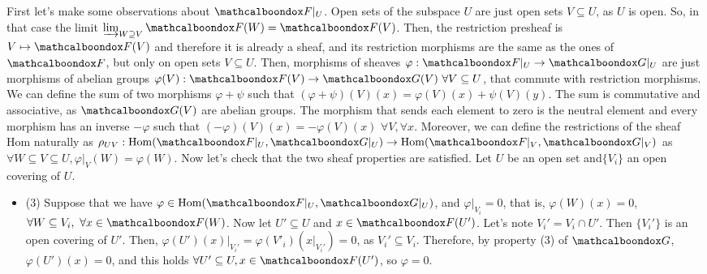 \begin{sol}
	First let's make some observations about $\sF|_U$. Open sets of the subspace $U$ are just open sets $V \subseteq U$, as $U$ is open. So, in that case the limit $\varinjlim_{W \supseteq V} \sF(W) = \sF(V)$. Then, the restriction presheaf is $V \mapsto \sF(V)$ and therefore it is already a sheaf, and its restriction morphisms are the same as the ones of $\sF$, but only on open sets $V \subseteq U$. Then, morphisms of sheaves $\varphi: \sF|_U \to \sG|_U$ are just morphisms of abelian groups $\varphi(V): \sF(V) \to \sG(V) \, \, \forall V \subseteq U$, that commute with restriction morphisms. We can define the sum of two morphisms $\varphi + \psi$ such that $(\varphi + \psi)(V)(x) = \varphi(V)(x) + \psi(V)(y)$. The sum is commutative and associative, as $\sG(V)$ are abelian groups. The morphism that sends each element to zero is the neutral element and every morphism has an inverse $-\varphi$ such that $(-\varphi)(V)(x) = -\varphi(V)(x) \, \, \forall V, \forall x$. Moreover, we can define the restrictions of the sheaf Hom naturally as $\rho_{UV}: \mathrm{Hom}(\sF|_U, \sG|_U) \to \mathrm{Hom}(\sF|_V, \sG|_V)$ as $\forall W \subseteq V \subseteq U, \varphi|_V (W) = \varphi(W)$. Now let's check that the two sheaf properties are satisfied. Let $U$ be an open set and$\{V_i\}$ an open covering of $U$.
	\begin{itemize}
		\item (3) Suppose that we have $\varphi \in \mathrm{Hom}(\sF|_{U}, \sG|_U)$, and $\varphi|_{V_i} = 0$, that is, $\varphi(W)(x) = 0$, $\forall W \subseteq V_i, \, \, \forall x \in \sF(W)$. Now let $U' \subseteq U$ and $x \in \sF(U')$. Let's note $V_i' = V_i \cap U'$. Then $\{V_i'\}$ is an open covering of $U'$. Then, $\varphi(U')(x)|_{V_i'} = \varphi(V'_i)(x|_{V_i'}) = 0$, as $V_i' \subseteq V_i$. Therefore, by property (3) of $\sG$, $\varphi(U')(x) = 0$, and this holds $\forall U' \subseteq U, x \in \sF(U')$, so $\varphi = 0$.


\end{itemize}
\end{sol}
